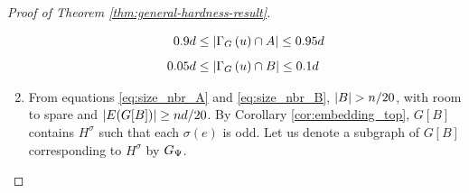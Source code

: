 \documentclass[11pt]{article}
\providecommand{\DIFaddbegin}{} %
\providecommand{\DIFaddend}{} %
\providecommand{\DIFdelbegin}{} %
\providecommand{\DIFdelend}{} %
\begin{document}
\begin{proof}[Proof of Theorem \ref{thm:general-hardness-result}]
\begin{enumerate}
{\begin{align} 
0.9d  &\leq   |\Gamma_{G}\left(u\right) \cap A| \leq 0.95d \label{eq:size_nbr_A}\\[5pt]
0.05d  &\leq   |\Gamma_{G}\left(u\right) \cap B| \leq 0.1d 
\label{eq:size_nbr_B}
\end{align}
}
\DIFaddend 

\DIFdelbegin %
\DIFdelend \DIFaddbegin \item{From equations \eqref{eq:size_nbr_A} and \eqref{eq:size_nbr_B}, $|B| > n/20$, with room to spare and $|E(G[B])| \ge nd/20$.
    By Corollary \ref{cor:embedding_top}, $G[B]$ contains $H^{\sigma}$ such that each $\sigma(e)$ is odd. Let us denote a subgraph of $G[B]$ corresponding to $H^{\sigma}$ by $G_{\Psi}$.
}
\end{enumerate}
\end{proof}
\end{document}
